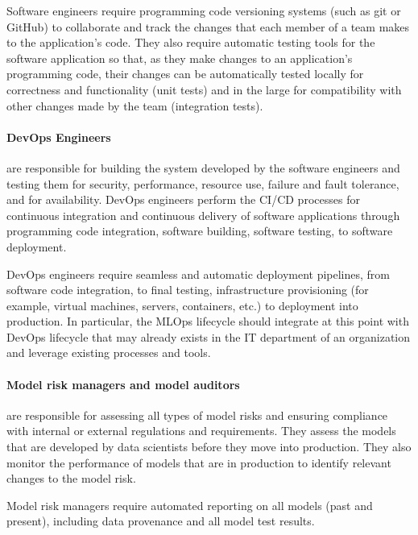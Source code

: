 Software engineers require programming code versioning systems (such as git or GitHub) to collaborate and track the changes that each member of a team makes to the application's code. They also require automatic testing tools for the software application so that, as they make changes to an application's programming code, their changes can be automatically tested locally for correctness and functionality (unit tests) and in the large for compatibility with other changes made by the team (integration tests). 

\paragraph*{DevOps Engineers} are responsible for building the system developed by the software engineers and testing them for security, performance, resource use, failure and fault tolerance, and for availability. DevOps engineers perform the CI/CD processes for continuous integration and continuous delivery of software applications through programming code integration, software building, software testing, to software deployment. 

DevOps engineers require seamless and automatic deployment pipelines, from software code integration, to final testing, infrastructure provisioning (for example, virtual machines, servers, containers, etc.) to deployment into production. In particular, the MLOps lifecycle should integrate at this point with DevOps lifecycle that may already exists in the IT department of an organization and leverage existing processes and tools. 

\paragraph*{Model risk managers and model auditors} are responsible for assessing all types of model risks and ensuring compliance with internal or external regulations and requirements. They assess the models that are developed by data scientists before they move into production. They also monitor the performance of models that are in production to identify relevant changes to the model risk. 

Model risk managers require automated reporting on all models (past and present), including data provenance and all model test results.

